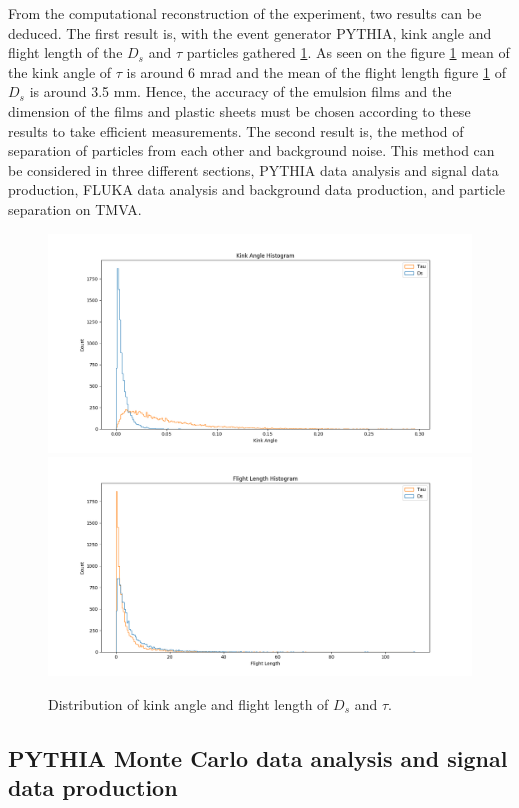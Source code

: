 \documentclass[12pt]{report}
\begin{document}
From the computational reconstruction of the experiment, two results can be deduced. The first result is, with the event generator PYTHIA, kink angle and flight length of the $D_s$ and $\tau$ particles gathered \ref{fig:Result}. As seen on the figure \ref{fig:Result} mean of the kink angle of $\tau$ is around 6 mrad and the mean of the flight length figure \ref{fig:Result} of $D_s$ is around 3.5 mm. Hence, the accuracy of the emulsion films and the dimension of the films and plastic sheets must be chosen according to these results to take efficient measurements. The second result is, the method of separation of particles from each other and background noise. This method can be considered in three different sections, PYTHIA data analysis and signal data production, FLUKA data analysis and background data production, and particle separation on TMVA.

\begin{figure}[htp]
\centering
\includegraphics[width = 12 cm]{KinkAngle.png}
\includegraphics[width = 12 cm]{FlightLength.png}
\caption{Distribution of kink angle and flight length of $D_s$ and $\tau$.}
\label{fig:Result}
\end{figure}


\subsection{PYTHIA Monte Carlo data analysis and signal data production}
\end{document}
